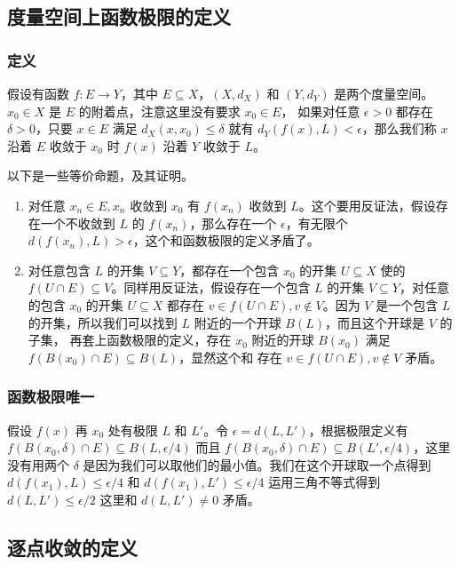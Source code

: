 \subsection{度量空间上函数极限的定义}

\subsubsection{定义}

假设有函数 $f: E \to Y$，其中 $E \subseteq X$，$(X, d_X)$ 和 $(Y, d_Y)$ 是两个度量空间。$x_0 \in X $ 是 $E$ 的附着点，注意这里没有要求 $x_0 \in E$，
如果对任意 $ \epsilon > 0$ 都存在 $ \delta > 0$，只要 $x \in E$ 满足 $d_X(x, x_0) \le \delta $ 就有 $d_Y(f(x), L) < \epsilon$，那么我们称 $x$ 沿着 $E$ 收敛于 $x_0$ 时 $f(x)$ 沿着 $Y$ 收敛于 $L$。

以下是一些等价命题，及其证明。

\begin{enumerate}
    \item 对任意 $x_n \in E, x_n$ 收敛到 $x_0$ 有 $f(x_n)$ 收敛到 $L$。这个要用反证法，假设存在一个不收敛到 $L$ 的 $f(x_n)$，那么存在一个 $\epsilon$，有无限个 $d(f(x_n), L) > \epsilon$，这个和函数极限的定义矛盾了。
    \item 对任意包含 $L$ 的开集 $V \subseteq Y$，都存在一个包含 $x_0$ 的开集 $U \subseteq X$ 使的 $f(U \cap E) \subseteq V$。同样用反证法，假设存在一个包含 $L$ 的开集 $V \subseteq Y$，对任意的包含 $x_0$ 的开集 $U \subseteq X$ 都存在 $v \in  f(U \cap E), v \notin V $。因为 $V$ 是一个包含 $L$ 的开集，所以我们可以找到 $L$ 附近的一个开球 $B(L)$，而且这个开球是 $V$ 的子集，
    再套上函数极限的定义，存在 $x_0$ 附近的开球 $B(x_0)$ 满足 $f(B(x_0) \cap E) \subseteq B(L)$，显然这个和 存在 $v \in  f(U \cap E), v \notin V $ 矛盾。
\end{enumerate}

\subsubsection{函数极限唯一}

假设 $f(x)$ 再 $x_0$ 处有极限 $L$ 和 $L'$。令 $\epsilon = d(L, L')$，根据极限定义有 $f(B(x_0, \delta) \cap E) \subseteq B(L, \epsilon/4)$ 而且 $f(B(x_0, \delta) \cap E) \subseteq B(L', \epsilon/4)$，这里没有用两个 $\delta$ 是因为我们可以取他们的最小值。我们在这个开球取一个点得到 $d(f(x_1), L) \le \epsilon/4 $ 和 $d(f(x_1), L') \le \epsilon/4$ 运用三角不等式得到 $d(L, L') \le  \epsilon/2 $ 这里和 $d(L, L') \ne 0 $ 矛盾。

\subsection{逐点收敛的定义}

